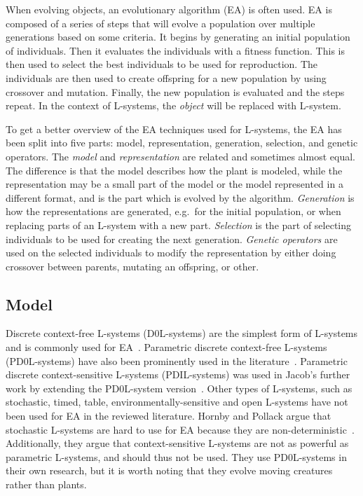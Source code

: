 When evolving objects, an evolutionary algorithm (EA) is often used.
EA is composed of a series of steps that will evolve a population over multiple generations based on some criteria.
It begins by generating an initial population of individuals.
Then it evaluates the individuals with a fitness function.
This is then used to select the best individuals to be used for reproduction.
The individuals are then used to create offspring for a new population by using crossover and mutation.
Finally, the new population is evaluated and the steps repeat.
In the context of L-systems, the \textit{object} will be replaced with L-system.

To get a better overview of the EA techniques used for L-systems, the EA has been split into five parts: model, representation, generation, selection, and genetic operators.
The \textit{model} and \textit{representation} are related and sometimes almost equal.
The difference is that the model describes how the plant is modeled, while the representation may be a small part of the model or the model represented in a different format, and is the part which is evolved by the algorithm.
\textit{Generation} is how the representations are generated, e.g.\ for the initial population, or when replacing parts of an L-system with a new part.
\textit{Selection} is the part of selecting individuals to be used for creating the next generation.
\textit{Genetic operators} are used on the selected individuals to modify the representation by either doing crossover between parents, mutating an offspring, or other.

\subsection{Model}
Discrete context-free L-systems (D0L-systems) are the simplest form of L-systems and is commonly used for EA~\cite{1998Mock,1998Ochoa,2002Ebner,2003Ebner,2006Ashlock,2009Beaumont,2009Corchado}.
Parametric discrete context-free L-systems (PD0L-systems) have also been prominently used in the literature~\cite{1994Jacob,2000Vanak,2001Hornby}.
Parametric discrete context-sensitive L-systems (PDIL-systems) was used in Jacob's further work by extending the PD0L-system version~\cite{1995Jacob, 1996Jacob, 1996Jacob-2}.
Other types of L-systems, such as stochastic, timed, table, environmentally-sensitive and open L-systems have not been used for EA in the reviewed literature.
Hornby and Pollack argue that stochastic L-systems are hard to use for EA because they are non-deterministic~\cite{2001Hornby}.
Additionally, they argue that context-sensitive L-systems are not as powerful as parametric L-systems, and should thus not be used.
They use PD0L-systems in their own research, but it is worth noting that they evolve moving creatures rather than plants.

